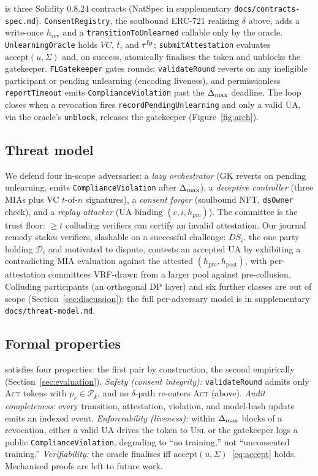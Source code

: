 \sysname is three Solidity 0.8.24 contracts (NatSpec in supplementary
\texttt{docs/contracts-spec.md}). \texttt{ConsentRegistry}, the
soulbound ERC-721 realising $\delta$ above, adds a write-once
$h_{\mathrm{rev}}$ and a \texttt{transitionToUnlearned} callable only by
the oracle. \texttt{UnlearningOracle} holds $\mathit{VC}$, $t$, and
$\tau^{\mathrm{fp}}$; \texttt{submitAttestation} evaluates
$\mathrm{accept}(u,\Sigma)$ and, on success, atomically finalises the
token and unblocks the gatekeeper. \texttt{FLGatekeeper} gates rounds:
\texttt{validateRound} reverts on any ineligible participant or pending
unlearning (encoding liveness), and permissionless \texttt{reportTimeout}
emits \texttt{ComplianceViolation} past the $\Delta_{\max}$ deadline. The loop
closes when a revocation fires \texttt{recordPendingUnlearning} and only
a valid UA, via the oracle's \texttt{unblock}, releases the gatekeeper
(Figure~\ref{fig:arch}).

\subsection{Threat model}

We defend four in-scope adversaries: a \emph{lazy orchestrator} (GK
reverts on pending unlearning, emits \texttt{ComplianceViolation} after
$\Delta_{\max}$), a \emph{deceptive controller} (three MIAs plus VC $t$-of-$n$
signatures), a \emph{consent forger} (soulbound NFT, \texttt{dsOwner}
check), and a \emph{replay attacker} (UA binding
$(c,i,h_{\mathrm{pre}})$). The committee is the trust floor: $\ge t$
colluding verifiers can certify an invalid attestation. Our journal
remedy stakes verifiers, slashable on a successful challenge:
$\mathit{DS}_i$, the one party holding $\mathcal{D}_i$ and motivated to
dispute, contests an accepted UA by exhibiting a contradicting MIA
evaluation against the attested
$(h_{\mathrm{pre}},h_{\mathrm{post}})$, with per-attestation committees
VRF-drawn from a larger pool against pre-collusion. Colluding participants (an
orthogonal DP layer) and six further classes are out of scope
(Section~\ref{sec:discussion}); the full per-adversary model is in
supplementary \texttt{docs/threat-model.md}.

\subsection{Formal properties}
\label{sec:properties}

\sysname satisfies four properties: the first pair by construction, the
second empirically (Section~\ref{sec:evaluation}). \emph{Safety (consent
integrity):} \texttt{validateRound} admits only \textsc{Act} tokens with
$\rho_r\in\mathcal{P}_k$, and no $\delta$-path re-enters \textsc{Act}
(above). \emph{Audit completeness:} every transition, attestation,
violation, and model-hash update emits an indexed event.
\emph{Enforceability (liveness):} within $\Delta_{\max}$ blocks of a revocation,
either a valid UA drives the token to \textsc{Unl} or the gatekeeper
logs a public \texttt{ComplianceViolation}, degrading to ``no
training,'' not ``unconsented training.'' \emph{Verifiability:} the
oracle finalises iff $\mathrm{accept}(u,\Sigma)$~\eqref{eq:accept} holds. Mechanised
proofs are left to future work.
